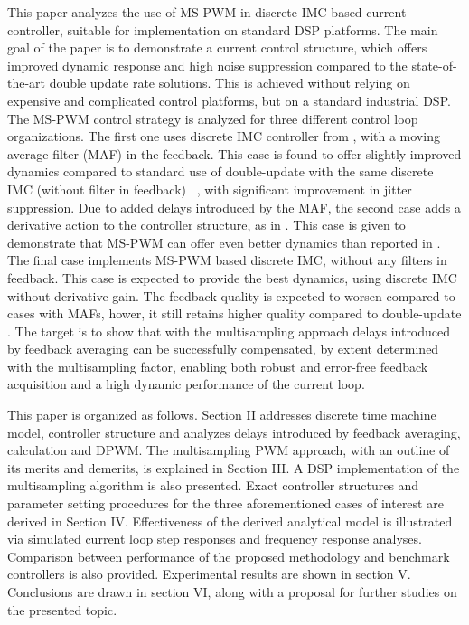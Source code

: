 \documentclass[journal]{IEEEtran}
\begin{document}
This paper analyzes the use of MS-PWM in discrete IMC based current controller, suitable for implementation on standard DSP platforms. The main goal of the paper is to demonstrate a current control structure, which offers improved dynamic response and high noise suppression compared to the state-of-the-art double update rate solutions. This is achieved without relying on expensive and complicated control platforms, but on a standard industrial DSP. The MS-PWM control strategy is analyzed for three different control loop organizations. The first one uses discrete IMC controller from \cite{vuksa2016}, with a moving average filter (MAF) in the feedback. This case is found to offer slightly improved dynamics compared to standard use of double-update with the same discrete IMC (without filter in feedback) ~\cite{lorenz2010,vuksa2016}, with significant improvement in jitter suppression. Due to added delays introduced by the MAF, the second case adds a derivative action to the controller structure, as in \cite{vuksa2016}. This case is given to demonstrate that MS-PWM can offer even better dynamics than reported in \cite{vuksa2016}. The final case implements MS-PWM based discrete IMC, without any filters in feedback. This case is expected to provide the best dynamics, using discrete IMC without derivative gain. The feedback quality is expected to worsen compared to cases with MAFs, hower, it still retains higher quality compared to double-update \cite{petric2020}. The target is to show that with the multisampling approach delays introduced by feedback averaging can be successfully compensated, by extent determined with the multisampling factor, enabling both robust and error-free feedback acquisition and a high dynamic performance of the current loop.

This paper is organized as follows. Section II addresses discrete time machine model, controller structure and analyzes delays introduced by feedback averaging, calculation and DPWM. The multisampling PWM approach, with an outline of its merits and demerits, is explained in Section III. A DSP implementation of the multisampling algorithm is also presented. Exact controller structures and parameter setting procedures for the three aforementioned cases of interest are derived in Section IV. Effectiveness of the derived analytical model is illustrated via simulated current loop step responses and frequency response analyses. Comparison between performance of the proposed methodology and benchmark controllers is also provided. Experimental results are shown in section V. Conclusions are drawn in section VI, along with a proposal for further studies on the presented topic.
 
\end{document}
